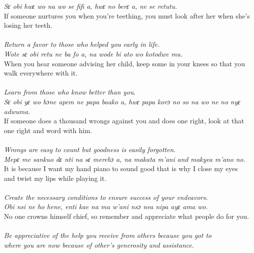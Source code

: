 \begin{refsection}
\noindent\textit{Sɛ obi hwɛ wo na wo se fifi a, hwɛ no berɛ a, ne se retutu.}\\
If someone nurtures you when you're teething, you must look after her when she's losing her teeth.\\ \\
\hspace*{10mm}\textit{Return a favor to those who helped you early in life.}\\

\noindent\textit{Wote sɛ obi retu ne ba fo a, na wode bi ato wo kotodwe mu.}\\
When you hear someone advising her child, keep some in your knees so that you walk everywhere with it.\\ \\
\hspace*{10mm}\textit{Learn from those who know better than you}.\\

\noindent\textit{Sɛ obi yɛ wo bɔne apem ne papa baako a, hwɛ papa korɔ no so na wo ne no nyɛ adwuma}.\\
If someone does a thousand wrongs against you and does one right, look at that one right and word with him.\\ \\
\hspace*{10mm}\textit{Wrongs are easy to count but goodness is easily forgotten}.\\

\noindent\textit{Mepɛ me sankuo dɛ nti na sɛ merebɔ a, na makata m’ani and makyea m’ano no.}\\
It is because I want my hand piano to sound good that is why I close my eyes and twist my lips while playing it.\\ \\
\hspace*{10mm}\textit{Create the necessary conditions to ensure success of your endeavors}.\\

\noindent\textit{Obi nsi ne ho hene, enti kae na ma w’ani nsɔ nea nipa ayɛ ama wo.}\\
No one crowns himself chief, so remember and appreciate what people do for you.\\ \\
\hspace*{10mm}\textit{Be appreciative of the help you receive from others because you got to}\\
\hspace*{10mm}\textit{where you are now because of other’s generosity and assistance.}\\
\newpage


\end{refsection}
